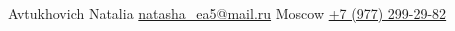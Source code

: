 \documentclass[myoption]{simplehipstercv}
\newlength{\rightcolwidth}
\begin{document}
\begin{paracol}{2}
\begin{minipage}[t]{0.35\textwidth}
\end{minipage}

\vspace{3em}
\setlength{\parindent}{0pt}
\begin{minipage}[t]{\rightcolwidth}
\begin{center}\fontfamily{\sfdefault}\selectfont \color{black!70}
{\small Avtukhovich Natalia  \href{mailto:natasha_ea5@mail.ru}{natasha\_ea5@mail.ru} Moscow  \href{tel:89772992982}{+7 (977) 299-29-82} \newline{}
}
\end{center}
\end{minipage}

\end{paracol}
\end{document}
